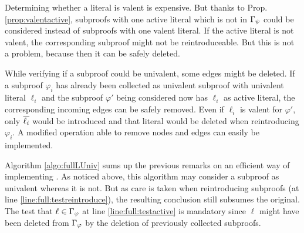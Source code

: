 \documentclass{llncs}
\begin{document}
Determining whether a literal is valent is expensive. But thanks to Prop. \ref{prop:valentactive},
subproofs with one active literal which is not in $\Gamma_{\psi}$ could be considered instead
of subproofs with one valent literal.  If the active literal is not valent, the corresponding
subproof might not be reintroduceable. But this is not a problem, because then it can be safely deleted.

While verifying if a subproof could be univalent, some edges might be deleted. If a
subproof $\varphi_i$ has already been collected as univalent subproof with univalent literal
$\ell_i$ and the subproof $\varphi'$ being considered now has $\ell_i$ as active literal, the
corresponding incoming edges can be safely removed. Even if $\ell_i$ is valent for $\varphi'$, only
$\overline{\ell_i}$ would be introduced and that literal would be deleted when reintroducing
$\varphi_i$. A modified  operation able to remove nodes and edges can easily be
implemented.

Algorithm \ref{algo:fullLUniv} sums up the previous remarks on an efficient way of implementing {\LowerUnivalents}. As noticed above, this algorithm may consider a subproof as univalent whereas
it is not. But as care is taken when reintroducing subproofs (at line
\ref{line:full:testreintroduce}), the resulting conclusion still subsumes the original.  The test
that $\ell \in \Gamma_{\varphi}$ at line \ref{line:full:testactive} is mandatory since $\ell$
might have been deleted from $\Gamma_{\varphi}$ by the deletion of previously collected
subproofs.
\end{document}
